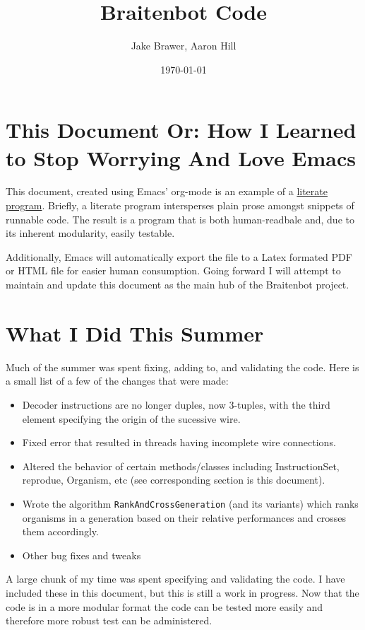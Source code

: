 \documentclass[a4paper]{article}
\author{Jake Brawer, Aaron Hill}
\date{\today}
\title{Braitenbot Code}
\begin{document}
\maketitle
\tableofcontents

\section{This Document Or: How I Learned to Stop Worrying And Love Emacs}
\label{sec-1}
This document, created using Emacs' org-mode is an example of a \href{https://en.wikipedia.org/wiki/Literate_programming}{literate program}. Briefly, a literate program intersperses plain prose amongst snippets of runnable code. The result is a program that is both human-readbale and, due to its inherent modularity, easily testable.\\
 \vspace

Additionally, Emacs will automatically export the file to a Latex formated PDF or HTML file for easier human consumption. Going forward I will attempt to maintain and update this document as the main hub of the Braitenbot project.

\section{What I Did This Summer}
\label{sec-2}
\indent Much of the summer was spent fixing, adding to, and validating the code. Here is a small list of a few of the changes that were made:
\begin{itemize}
\item Decoder instructions are no longer duples, now 3-tuples, with the third element specifying the origin of the sucessive wire.
\item Fixed error that resulted in threads having incomplete wire connections.
\item Altered the behavior of certain methods/classes including InstructionSet, reprodue, Organism, etc (see corresponding section is this document).
\item Wrote the algorithm \texttt{RankAndCrossGeneration} (and its variants) which ranks organisms in a generation based on their relative performances and crosses them accordingly.
\item Other bug fixes and tweaks
\end{itemize}

A large chunk of my time was spent specifying and validating the code. I have included these in this document, but this is still a work in progress. Now that the code is in a more modular format the code can be tested more easily and therefore more robust test can be administered.\\
\vspace
\end{document}
